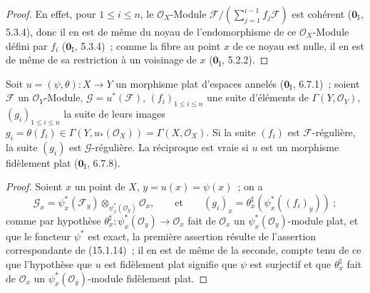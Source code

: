 \begin{proof}
En effet, pour $1\leq i\leq n$, le $\mathcal{O}_X$-Module
$\mathscr{F}/(\sum_{j=1}^{i-1}f_j\mathscr{F})$ est cohérent
($\mathbf{0}_{\mathrm I}$, 5.3.4), donc il en est de même du noyau de
l'endomorphisme de ce $\mathcal{O}_X$-Module défini par $f_i$
($\mathbf{0}_{\mathrm I}$, 5.3.4)~; comme la fibre au point $x$ de ce noyau est nulle,
il en est de même de sa restriction à un voisinage de $x$
($\mathbf{0}_{\mathrm I}$, 5.2.2).
\end{proof}

\begin{proposition}[15.2.5]
\label{0.15.2.5-fr}
Soit $u=(\psi,\theta):X\to Y$ un morphisme plat d'espaces annelés
\textup{($\mathbf{0}_{\mathrm I}$, 6.7.1)}~; soient $\mathscr{F}$ un
$\mathcal{O}_Y$-Module, $\mathscr{G}=u^*(\mathscr{F})$,
$(f_i)_{1\leq i\leq n}$ une suite d'éléments de
$\Gamma(Y,\mathcal{O}_Y)$, $(g_i)_{1\leq i\leq n}$ la suite de leurs images
$g_i=\theta(f_i)\in\Gamma(Y,u_*(\mathcal{O}_X))=\Gamma(X,\mathcal{O}_X)$. Si
la suite $(f_i)$ est $\mathscr{F}$-régulière, la suite $(g_i)$ est
$\mathscr{G}$-régulière. La réciproque est vraie si $u$ est un morphisme
fidèlement plat \textup{($\mathbf{0}_{\mathrm I}$, 6.7.8)}.
\end{proposition}

\begin{proof}
Soient $x$ un point de $X$, $y=u(x)=\psi(x)$~; on a
\[
  \mathscr{G}_x=\psi_x^*(\mathscr{F}_y)
  \otimes_{\psi_x^*(\mathcal{O}_y)}\mathcal{O}_x,
  \qquad\text{et}\qquad
  (g_i)_x=\theta_x^\sharp(\psi_x^*((f_i)_y))~;
\]
comme par hypothèse
$\theta_x^\sharp:\psi_x^*(\mathcal{O}_y)\to\mathcal{O}_x$ fait de
$\mathcal{O}_x$ un $\psi_x^*(\mathcal{O}_y)$-module plat, et que le foncteur
$\psi^*$ est exact, la première assertion résulte de l'assertion correspondante
de (15.1.14)~; il en est de même de la seconde, compte tenu de ce que
l'hypothèse que $u$ est fidèlement plat signifie que $\psi$ est surjectif et
que $\theta_x^\sharp$ fait de $\mathcal{O}_x$ un
$\psi_x^*(\mathcal{O}_y)$-module fidèlement plat.
\end{proof}
